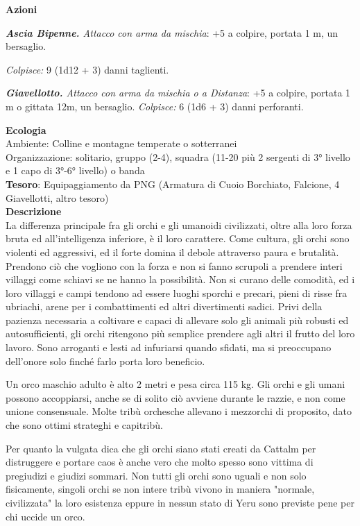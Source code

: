 \begin{multicols}{2}
	\textbf{Azioni}

	\textit{\textbf{Ascia Bipenne.} Attacco con arma da mischia}: +5 a colpire, portata 1 m, un bersaglio.

	\textit{Colpisce:} 9 (1d12 + 3) danni taglienti.

	\textit{\textbf{Giavellotto.} Attacco con arma da mischia o a Distanza}: +5 a colpire, portata 1 m o gittata 12m, un bersaglio. \textit{Colpisce:} 6 (1d6 + 3) danni perforanti.

	\textbf{Ecologia}\\
	Ambiente: Colline e montagne temperate o sotterranei\\
	Organizzazione: solitario, gruppo (2-4), squadra (11-20 più 2 sergenti di 3° livello e 1 capo di 3°-6° livello) o banda \\
	\textbf{Tesoro}: Equipaggiamento da PNG (Armatura di Cuoio Borchiato, Falcione, 4 Giavellotti, altro tesoro)\\
	\textbf{Descrizione}\\
	La differenza principale fra gli orchi e gli umanoidi civilizzati, oltre alla loro forza bruta ed all'intelligenza inferiore, è il loro carattere. Come cultura, gli orchi sono violenti ed aggressivi, ed il forte domina il debole attraverso paura e brutalità. Prendono ciò che vogliono con la forza e non si fanno scrupoli a prendere interi villaggi come schiavi se ne hanno la possibilità. Non si curano delle comodità, ed i loro villaggi e campi tendono ad essere luoghi sporchi e precari, pieni di risse fra ubriachi, arene per i combattimenti ed altri divertimenti sadici. Privi della pazienza necessaria a coltivare e capaci di allevare solo gli animali più robusti ed autosufficienti, gli orchi ritengono più semplice prendere agli altri il frutto del loro lavoro. Sono arroganti e lesti ad infuriarsi quando sfidati, ma si preoccupano dell'onore solo finché farlo porta loro beneficio.

	Un orco maschio adulto è alto 2 metri e pesa circa 115 kg. Gli orchi e gli umani possono accoppiarsi, anche se di solito ciò avviene durante le razzie, e non come unione consensuale. Molte tribù orchesche allevano i mezzorchi di proposito, dato che sono ottimi strateghi e capitribù.

	Per quanto la vulgata dica che gli orchi siano stati creati da Cattalm per distruggere e portare caos è anche vero che molto spesso sono vittima di pregiudizi e giudizi sommari. Non tutti gli orchi sono uguali e non solo fisicamente, singoli orchi se non intere tribù vivono in maniera "normale, civilizzata" la loro esistenza eppure in nessun stato di Yeru sono previste pene per chi uccide un orco.


\end{multicols}
